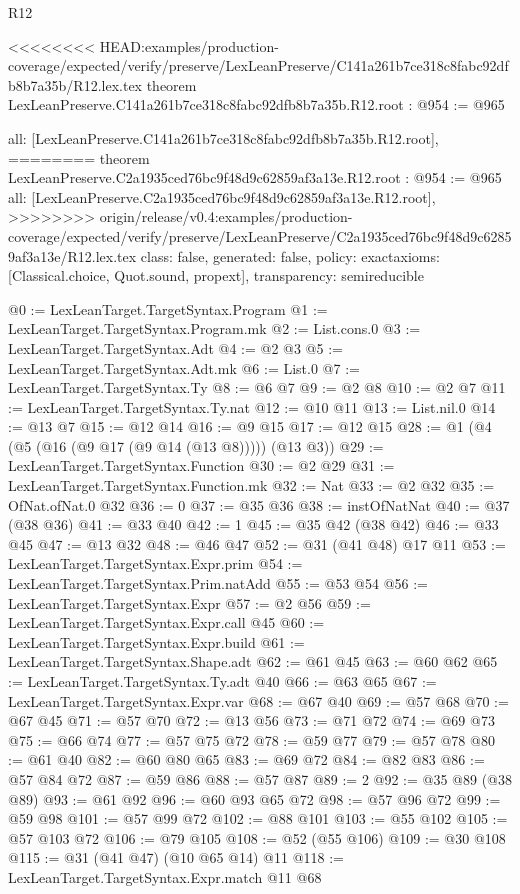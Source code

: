 \begin{lexlean}{R12}
\begin{coremodule}
{{{{{{{{}
<<<<<<<< HEAD:examples/production-coverage/expected/verify/preserve/LexLeanPreserve/C141a261b7ce318c8fabc92dfb8b7a35b/R12.lex.tex
theorem LexLeanPreserve.C141a261b7ce318c8fabc92dfb8b7a35b.R12.root : @954 := @965 {
  all: [LexLeanPreserve.C141a261b7ce318c8fabc92dfb8b7a35b.R12.root],
========
theorem LexLeanPreserve.C2a1935ced76bc9f48d9c62859af3a13e.R12.root : @954 := @965 {
  all: [LexLeanPreserve.C2a1935ced76bc9f48d9c62859af3a13e.R12.root],
>>>>>>>> origin/release/v0.4:examples/production-coverage/expected/verify/preserve/LexLeanPreserve/C2a1935ced76bc9f48d9c62859af3a13e/R12.lex.tex
  class: false,
  generated: false,
  policy: exact{axioms: [Classical.choice, Quot.sound, propext]},
  transparency: semireducible
}

@0 := LexLeanTarget.TargetSyntax.Program
@1 := LexLeanTarget.TargetSyntax.Program.mk
@2 := List.cons.{0}
@3 := LexLeanTarget.TargetSyntax.Adt
@4 := @2 @3
@5 := LexLeanTarget.TargetSyntax.Adt.mk
@6 := List.{0}
@7 := LexLeanTarget.TargetSyntax.Ty
@8 := @6 @7
@9 := @2 @8
@10 := @2 @7
@11 := LexLeanTarget.TargetSyntax.Ty.nat
@12 := @10 @11
@13 := List.nil.{0}
@14 := @13 @7
@15 := @12 @14
@16 := @9 @15
@17 := @12 @15
@28 := @1 (@4 (@5 (@16 (@9 @17 (@9 @14 (@13 @8))))) (@13 @3))
@29 := LexLeanTarget.TargetSyntax.Function
@30 := @2 @29
@31 := LexLeanTarget.TargetSyntax.Function.mk
@32 := Nat
@33 := @2 @32
@35 := OfNat.ofNat.{0} @32
@36 := 0
@37 := @35 @36
@38 := instOfNatNat
@40 := @37 (@38 @36)
@41 := @33 @40
@42 := 1
@45 := @35 @42 (@38 @42)
@46 := @33 @45
@47 := @13 @32
@48 := @46 @47
@52 := @31 (@41 @48) @17 @11
@53 := LexLeanTarget.TargetSyntax.Expr.prim
@54 := LexLeanTarget.TargetSyntax.Prim.natAdd
@55 := @53 @54
@56 := LexLeanTarget.TargetSyntax.Expr
@57 := @2 @56
@59 := LexLeanTarget.TargetSyntax.Expr.call @45
@60 := LexLeanTarget.TargetSyntax.Expr.build
@61 := LexLeanTarget.TargetSyntax.Shape.adt
@62 := @61 @45
@63 := @60 @62
@65 := LexLeanTarget.TargetSyntax.Ty.adt @40
@66 := @63 @65
@67 := LexLeanTarget.TargetSyntax.Expr.var
@68 := @67 @40
@69 := @57 @68
@70 := @67 @45
@71 := @57 @70
@72 := @13 @56
@73 := @71 @72
@74 := @69 @73
@75 := @66 @74
@77 := @57 @75 @72
@78 := @59 @77
@79 := @57 @78
@80 := @61 @40
@82 := @60 @80 @65
@83 := @69 @72
@84 := @82 @83
@86 := @57 @84 @72
@87 := @59 @86
@88 := @57 @87
@89 := 2
@92 := @35 @89 (@38 @89)
@93 := @61 @92
@96 := @60 @93 @65 @72
@98 := @57 @96 @72
@99 := @59 @98
@101 := @57 @99 @72
@102 := @88 @101
@103 := @55 @102
@105 := @57 @103 @72
@106 := @79 @105
@108 := @52 (@55 @106)
@109 := @30 @108
@115 := @31 (@41 @47) (@10 @65 @14) @11
@118 := LexLeanTarget.TargetSyntax.Expr.match @11 @68
}}}}}}}}
\end{coremodule}
\end{lexlean}

